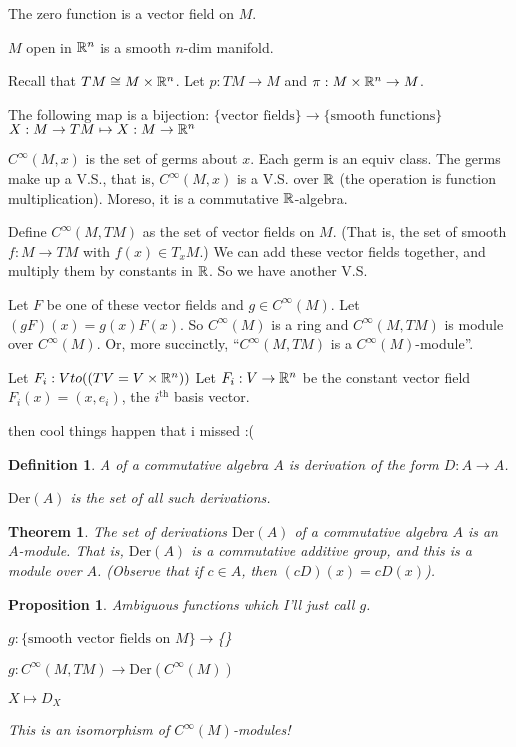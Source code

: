 \documentclass[11pt]{amsbook}
\theoremstyle{mystyle} \newtheorem{thrm}[thm]{Theorem}
\theoremstyle{mystyle} \newtheorem{defi}[thm]{Definition}
\theoremstyle{mystyle} \newtheorem{coro}[thm]{Corollary}
\theoremstyle{mystyle} \newtheorem{propo}[thm]{Proposition}
\theoremstyle{mystyle} \newtheorem{lemm}[thm]{Lemma}
\numberwithin{thm}{section}
\newcommand{\x}{\times}
\newcommand{\Der}{\text{Der}}
\begin{document}

\begin{example}
	The zero function is a vector field on $M$.
\end{example}
\begin{example}
	$M$ open in ${\mathbb R}^n$ is a smooth $n$-dim manifold.

	Recall that $TM \mathrel{\cong}   M \times {\mathbb R}^n$.  Let $p:TM \to M$ and $\pi:M \times {\mathbb R}^n \to M$.

	The following map is a bijection:
	$\{\text{vector fields}\} \to \{\text{smooth functions}\}$
	$        X: M \to TM      \mapsto     X: M \to {\mathbb R}^n$
\end{example}
\begin{example}
	$C^\infty(M,x)$ is the set of germs about $x$.
	Each germ is an equiv class.
	The germs make up a V.S., that is, $C^\infty(M,x)$ is a V.S. over ${\mathbb R}$ (the operation is function multiplication).  Moreso, it is a commutative ${\mathbb R}$-algebra.

	Define $C^\infty(M, TM)$ as the set of vector fields on $M$.  (That is, the set of smooth $f: M \to TM$ with $f(x) \in T_xM$.)  We can add these vector fields together, and multiply them by constants in ${\mathbb R}$.  So we have another V.S.

	Let $F$ be one of these vector fields and $g \in C^\infty(M)$.
	Let $(gF)(x) = g(x)F(x)$.
	So $C^\infty(M)$ is a ring and $C^\infty(M, TM)$ is module over $C^\infty(M)$.  Or, more succinctly, ``$C^\infty(M, TM)$ is a $C^\infty(M)$-module''.

	Let $F_i : V to ((TV = V \x \R^n))$
	Let $F_i : V \to {\mathbb R}^n$ be the constant vector field $F_i(x) = (x,e_i)$, the $i^\text{th}$ basis vector.

	then cool things happen that i missed :(
\end{example}
\begin{defi}
	A  of a commutative algebra $A$ is derivation of the form $D: A \to A$.

	$\Der(A)$ is the set of all such derivations.
\end{defi}
\begin{thrm}
	The set of derivations $\Der(A)$ of a commutative algebra $A$ is an $A$-module.  That is, $\Der(A)$ is a commutative additive group, and this is a module over $A$.  (Observe that if $c \in A$, then $(cD)(x) = cD(x)$).
\end{thrm}

\begin{propo}
	Ambiguous functions which I'll just call $g$.

	$g : \{\text{smooth vector fields on $M$}\} \to $\{\}

	$g : C^\infty(M,TM) \to \Der(C^\infty(M))$

	$X \mapsto D_X$

	This is an isomorphism of $C^\infty(M)$-modules!
\end{propo}
\end{document}

